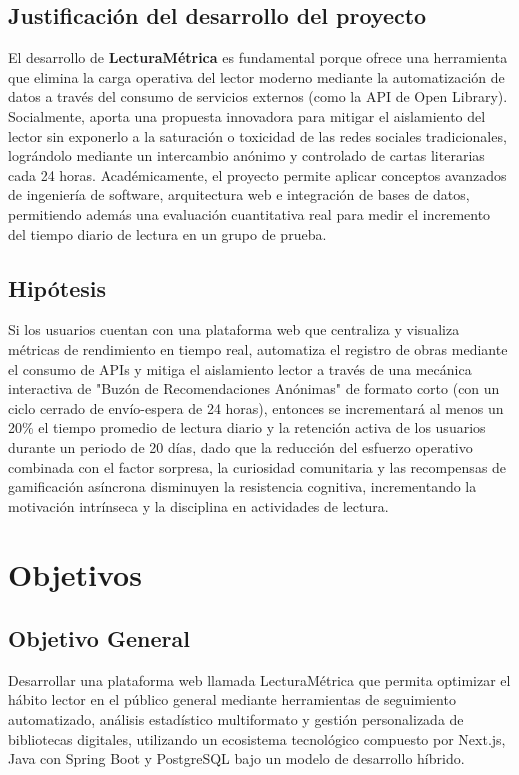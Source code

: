 \documentclass[12pt, atypical, journal]{article}
\begin{document}
\subsection{Justificación del desarrollo del proyecto}
El desarrollo de \textbf{LecturaMétrica} es fundamental porque ofrece una herramienta que elimina la carga operativa del lector moderno mediante la automatización de datos a través del consumo de servicios externos (como la API de Open Library). Socialmente, aporta una propuesta innovadora para mitigar el aislamiento del lector sin exponerlo a la saturación o toxicidad de las redes sociales tradicionales, lográndolo mediante un intercambio anónimo y controlado de cartas literarias cada 24 horas. Académicamente, el proyecto permite aplicar conceptos avanzados de ingeniería de software, arquitectura web e integración de bases de datos, permitiendo además una evaluación cuantitativa real para medir el incremento del tiempo diario de lectura en un grupo de prueba.

\subsection{Hipótesis}
Si los usuarios cuentan con una plataforma web que centraliza y visualiza métricas de rendimiento en tiempo real, automatiza el registro de obras mediante el consumo de APIs y mitiga el aislamiento lector a través de una mecánica interactiva de "Buzón de Recomendaciones Anónimas" de formato corto (con un ciclo cerrado de envío-espera de 24 horas), entonces se incrementará al menos un 20\% el tiempo promedio de lectura diario y la retención activa de los usuarios durante un periodo de 20 días, dado que la reducción del esfuerzo operativo combinada con el factor sorpresa, la curiosidad comunitaria y las recompensas de gamificación asíncrona disminuyen la resistencia cognitiva, incrementando la motivación intrínseca y la disciplina en actividades de lectura.

\newpage

\section{Objetivos}

\subsection{Objetivo General}
Desarrollar una plataforma web llamada LecturaMétrica que permita optimizar el hábito lector en el público general mediante herramientas de seguimiento automatizado, análisis estadístico multiformato y gestión personalizada de bibliotecas digitales, utilizando un ecosistema tecnológico compuesto por Next.js, Java con Spring Boot y PostgreSQL bajo un modelo de desarrollo híbrido.
\end{document}
